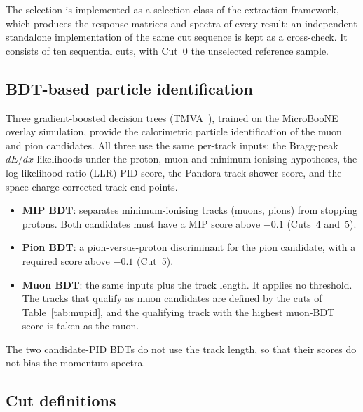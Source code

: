 \documentclass[11pt,a4paper]{article}
\newcommand{\uboone}{MicroBooNE}
\begin{document}
The selection is implemented as a selection class of the extraction framework, which produces the
response matrices and spectra of every result; an independent standalone implementation of the
same cut sequence is kept as a cross-check. It consists of ten sequential cuts, with Cut~0 the
unselected reference sample.

\subsection{BDT-based particle identification}
\label{sec:bdt}

Three gradient-boosted decision trees (TMVA~\cite{tmva}), trained on the \uboone{} overlay
simulation, provide the calorimetric particle identification of the muon and pion candidates. All
three use the same per-track inputs: the Bragg-peak $dE/dx$ likelihoods under the proton, muon and
minimum-ionising hypotheses, the log-likelihood-ratio (LLR) PID score, the Pandora track-shower
score, and the space-charge-corrected track end points.
\begin{itemize}\itemsep2pt
  \item \textbf{MIP BDT}: separates minimum-ionising tracks (muons, pions) from stopping protons.
    Both candidates must have a MIP score above $-0.1$ (Cuts~4 and~5).
  \item \textbf{Pion BDT}: a pion-versus-proton discriminant for the pion candidate, with a
    required score above $-0.1$ (Cut~5).
  \item \textbf{Muon BDT}: the same inputs plus the track length. It applies no threshold. The
    tracks that qualify as muon candidates are defined by the cuts of Table~\ref{tab:mupid}, and the
    qualifying track with the highest muon-BDT score is taken as the muon.
\end{itemize}
The two candidate-PID BDTs do not use the track length, so that their scores do not bias the
momentum spectra. 

\subsection{Cut definitions}
\label{sec:cutdefs}
\end{document}
